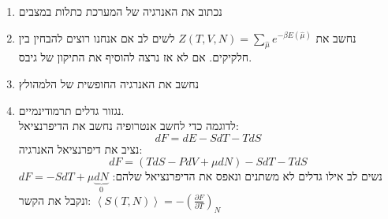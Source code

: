 \begin{cheatformula}
    \begin{enumerate}
        \item נכתוב את האנרגיה של המערכת כתלות במצבים
        \item נחשב את $Z\left(T,V,N\right) = \sum_{\hat{\mu}} e^{-\beta E\left(\hat{\mu}\right)}$
        לשים לב אם אנחנו רוצים להבחין בין חלקיקים. אם לא אז נרצה להוסיף את התיקון של גיבס.
        \item נחשב את האנרגיה החופשית של הלמהולץ
        \item נגזור גדלים תרמודינמיים. \\
        לדוגמה כדי לחשב אנטרופיה נחשב את הדיפרנציאל:
        $$ dF = dE - SdT - TdS$$
        נציב את דיפרנציאל האנרגיה:
        $$dF = \left( TdS -PdV + \mu dN \right) - SdT - TdS$$
        נשים לב אילו גדלים לא משתנים ונאפס את הדיפרנציאל שלהם:
        $dF = -SdT + \mu \underset{0}{\underbrace{dN}}$
        ונקבל את הקשר:
        $\left< S \left(T,N\right) \right> = - \left( \frac{\partial F}{\partial T} \right)_N$
    \end{enumerate}
\end{cheatformula}
